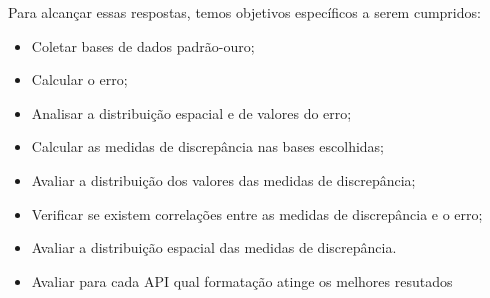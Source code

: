 Para alcançar essas respostas, temos objetivos específicos a serem cumpridos:

\begin{itemize}
   \item Coletar bases de dados padrão-ouro;
   \item Calcular o erro;
   \item Analisar a distribuição espacial e de valores do erro;
   \item Calcular as medidas de discrepância nas bases escolhidas;
   \item Avaliar a distribuição dos valores das medidas de discrepância;
   \item Verificar se existem correlações entre as medidas de discrepância e o erro;
   \item Avaliar a distribuição espacial das medidas de discrepância. 
   \item Avaliar para cada API qual formatação atinge os melhores resutados
\end{itemize}






